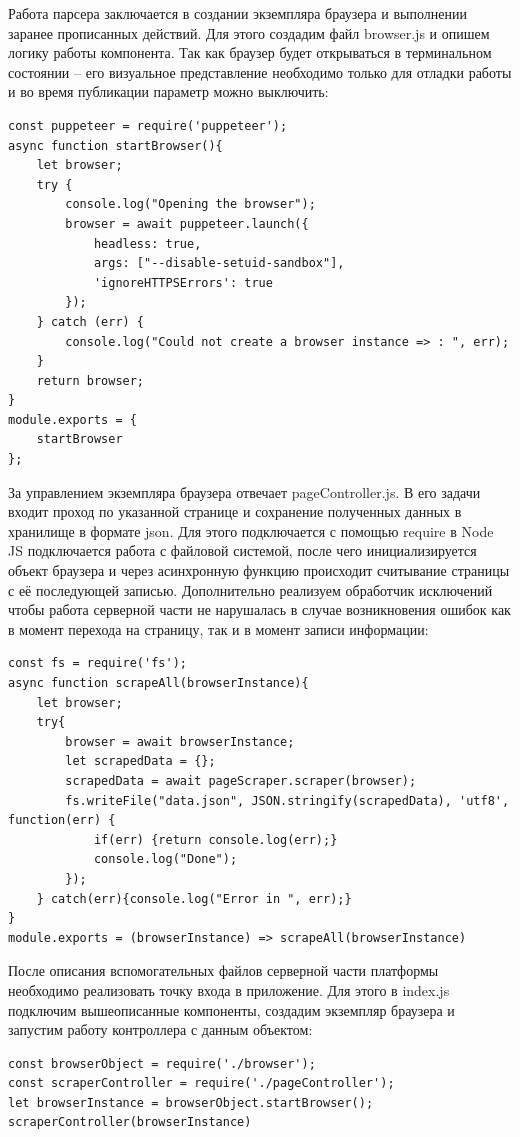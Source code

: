 \documentclass[master, och, diploma]{SCWorks}
\begin{document}
Работа парсера заключается в создании экземпляра браузера и выполнении заранее прописанных действий. Для этого создадим файл browser.js и опишем логику работы компонента. Так как браузер будет открываться в терминальном состоянии – его визуальное представление необходимо только для отладки работы и во время публикации параметр можно выключить:
\begin{verbatim}
const puppeteer = require('puppeteer');
async function startBrowser(){
	let browser;
	try {
	    console.log("Opening the browser");
	    browser = await puppeteer.launch({
	        headless: true,
	        args: ["--disable-setuid-sandbox"],
	        'ignoreHTTPSErrors': true
	    });
	} catch (err) {
	    console.log("Could not create a browser instance => : ", err);
	}
	return browser;
}
module.exports = {
	startBrowser
};
\end{verbatim}

За управлением экземпляра браузера отвечает pageController.js. В его задачи входит проход по указанной странице и сохранение полученных данных в хранилище в формате json. Для этого подключается с помощью require в Node JS подключается работа с файловой системой, после чего инициализируется объект браузера и через асинхронную функцию происходит считывание страницы с её последующей записью. Дополнительно реализуем обработчик исключений чтобы работа серверной части не нарушалась в случае возникновения ошибок как в момент перехода на страницу, так и в момент записи информации:
\begin{verbatim}
const fs = require('fs');
async function scrapeAll(browserInstance){
    let browser;
	try{
	    browser = await browserInstance;
	    let scrapedData = {};
	    scrapedData = await pageScraper.scraper(browser);
	    fs.writeFile("data.json", JSON.stringify(scrapedData), 'utf8', function(err) {
		    if(err) {return console.log(err);}
		    console.log("Done");
	    });
    } catch(err){console.log("Error in ", err);}
}
module.exports = (browserInstance) => scrapeAll(browserInstance)
\end{verbatim}

После описания вспомогательных файлов серверной части платформы необходимо реализовать точку входа в приложение. Для этого в index.js подключим вышеописанные компоненты, создадим экземпляр браузера и запустим работу контроллера с данным объектом:
\begin{verbatim}
const browserObject = require('./browser');
const scraperController = require('./pageController');
let browserInstance = browserObject.startBrowser();
scraperController(browserInstance)
\end{verbatim}
\end{document}
